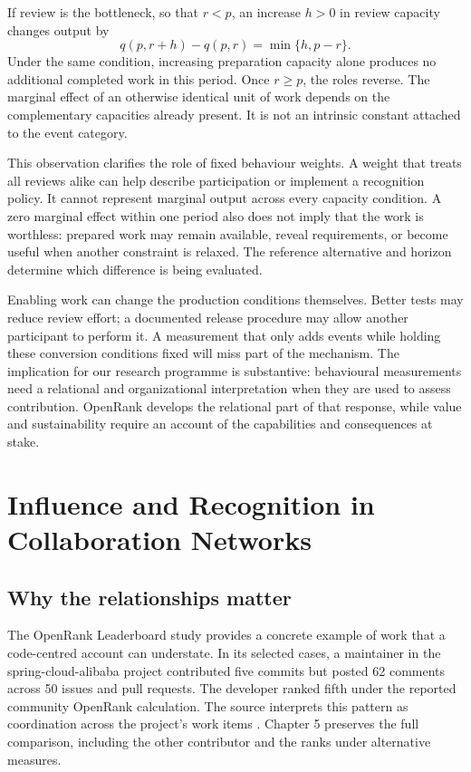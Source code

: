 If review is the bottleneck, so that \(r<p\), an increase \(h>0\) in review capacity changes output by
\begin{equation}
q(p,r+h)-q(p,r)=\min\{h,p-r\}.
\label{eq:capacity-gain}
\end{equation}
Under the same condition, increasing preparation capacity alone produces no additional completed work in this period. Once \(r\geq p\), the roles reverse. The marginal effect of an otherwise identical unit of work depends on the complementary capacities already present. It is not an intrinsic constant attached to the event category.

This observation clarifies the role of fixed behaviour weights. A weight that treats all reviews alike can help describe participation or implement a recognition policy. It cannot represent marginal output across every capacity condition. A zero marginal effect within one period also does not imply that the work is worthless: prepared work may remain available, reveal requirements, or become useful when another constraint is relaxed. The reference alternative and horizon determine which difference is being evaluated.

Enabling work can change the production conditions themselves. Better tests may reduce review effort; a documented release procedure may allow another participant to perform it. A measurement that only adds events while holding these conversion conditions fixed will miss part of the mechanism. The implication for our research programme is substantive: behavioural measurements need a relational and organizational interpretation when they are used to assess contribution. OpenRank develops the relational part of that response, while value and sustainability require an account of the capabilities and consequences at stake.

\section{Influence and Recognition in Collaboration Networks}
\label{sec:ch2-influence}
\label{sec:credit-learning}

\subsection{Why the relationships matter}
The OpenRank Leaderboard study provides a concrete example of work that a code-centred account can understate. In its selected cases, a maintainer in the spring-cloud-alibaba project contributed five commits but posted 62 comments across 50 issues and pull requests. The developer ranked fifth under the reported community OpenRank calculation. The source interprets this pattern as coordination across the project's work items \citep[Section 4.1 and Table 4]{zhao2024}. Chapter 5 preserves the full comparison, including the other contributor and the ranks under alternative measures.

